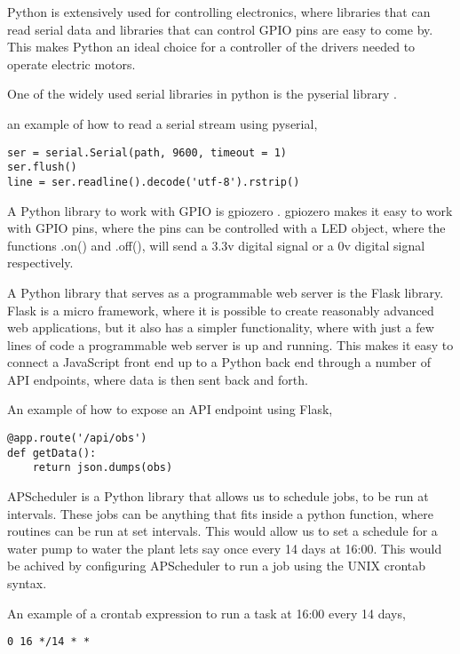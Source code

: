 \documentclass[12pt,a4paper,oneside]{book}
\begin{document}
Python is extensively used for controlling electronics, where libraries that can read serial data and libraries that can control GPIO pins are easy to come by. This makes Python an ideal choice for a controller of the drivers needed to operate electric motors.

\bigskip

One of the widely used serial libraries in python is the pyserial library \cite{pyserial}.

an example of how to read a serial stream using pyserial,

\begin{verbatim}
ser = serial.Serial(path, 9600, timeout = 1)
ser.flush()
line = ser.readline().decode('utf-8').rstrip()
\end{verbatim}

\bigskip

A Python library to work with GPIO is gpiozero \cite{gpiozero}.
gpiozero makes it easy to work with GPIO pins, where the pins can be controlled with a LED object, where the functions .on() and .off(), will send a 3.3v digital signal or a 0v digital signal respectively.

\bigskip

A Python library that serves as a programmable web server is the Flask library. Flask is a micro framework, where it is possible to create reasonably advanced web applications, but it also has a simpler functionality, where with just a few lines of code a programmable web server is up and running.
This makes it easy to connect a JavaScript front end up to a Python back end through a number of API endpoints, where data is then sent back and forth.

An example of how to expose an API endpoint using Flask,
\begin{verbatim}
@app.route('/api/obs')
def getData():
    return json.dumps(obs)
\end{verbatim}

\bigskip

APScheduler is a Python library that allows us to schedule jobs, to be run at intervals. These jobs can be anything that fits inside a python function, where routines can be run at set intervals. This would allow us to set a schedule for a water pump to water the plant lets say once every 14 days at 16:00.
This would be achived by configuring APScheduler to run a job using the UNIX crontab syntax.

An example of a crontab expression to run a task at 16:00 every 14 days,
\begin{verbatim}
0 16 */14 * *
\end{verbatim}
\end{document}
